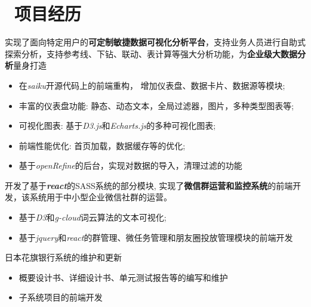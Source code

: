 \documentclass{resume}
\begin{document}
\section{\faUsers\ 项目经历}



\begin{onehalfspacing}
实现了面向特定用户的\textbf{可定制敏捷数据可视化分析平台}，支持业务人员进行自助式探索分析，支持参考线、下钻、联动、表计算等强大分析功能，为\textbf{企业级大数据分析}量身打造
\begin{itemize}
  \item 在\textit{saiku}开源代码上的前端重构， 增加仪表盘、数据卡片、数据源等模块;
  \item 丰富的仪表盘功能: 静态、动态文本，全局过滤器，图片，多种类型图表等;
  \item 可视化图表: 基于\textit{D3.js}和\textit{Echarts.js}的多种可视化图表;
  \item 前端性能优化: 首页加载，数据缓存等的优化;
  \item 基于\textit{openRefine}的后台，实现对数据的导入，清理过滤的功能
\end{itemize}
\end{onehalfspacing}

\begin{onehalfspacing}
开发了基于\textit{\textbf{react}}的SASS系统的部分模块, 实现了\textbf{微信群运营和监控系统}的前端开发，该系统用于中小型企业微信社群的运营。

\begin{itemize}
  \item 基于\textit{D3}和\textit{g-cloud}词云算法的文本可视化;
  \item 基于\textit{jquery}和\textit{react}的群管理、微任务管理和朋友圈投放管理模块的前端开发
\end{itemize}
\end{onehalfspacing}

\begin{onehalfspacing}
日本花旗银行系统的维护和更新
\begin{itemize}
  \item 概要设计书、详细设计书、单元测试报告等的编写和维护
  \item 子系统项目的前端开发
\end{itemize}
\end{onehalfspacing}
\end{document}

